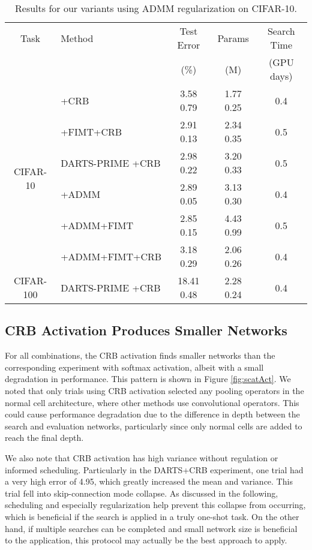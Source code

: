 \documentclass[letterpaper]{article} \usepackage{aaai22}  \usepackage{times}  \usepackage{helvet}  \usepackage{courier}  \usepackage[hyphens]{url}  \usepackage{graphicx} \urlstyle{rm} \def\UrlFont{\rm}  \usepackage{natbib}  \usepackage{caption} \DeclareCaptionStyle{ruled}{labelfont=normalfont,labelsep=colon,strut=off} \frenchspacing  \setlength{\pdfpagewidth}{8.5in}  \setlength{\pdfpageheight}{11in}  \usepackage{algorithm}
\begin{document}
\begin{table*}[tb!]
\centering \small
\begin{tabular}{@{}clccc@{}}
\toprule
Task & Method  &  Test Error \hspace{1mm} &  \hspace{1mm} Params \hspace{1mm} & \hspace{1mm} Search Time \\
 & &  (\%) \hspace{1mm} &  \hspace{1mm} (M) \hspace{1mm} & \hspace{1mm} (GPU days)
\\  \midrule
\multirow{6}{*}{CIFAR-10} 
& +CRB & 3.58  0.79 & 1.77  0.25 & 0.4 \\
& +FIMT+CRB & 2.91  0.13 & 2.34  0.35 & 0.5 \\
& DARTS-PRIME +CRB & 2.98  0.22 & 3.20  0.33 & 0.5 \\
& +ADMM & 2.89  0.05 & 3.13  0.30 & 0.4 \\
& +ADMM+FIMT & 2.85  0.15 & 4.43  0.99 & 0.5 \\
& +ADMM+FIMT+CRB & 3.18  0.29 & 2.06  0.26 & 0.4 \\
\midrule\midrule
\multirow{1}{*}{CIFAR-100} & DARTS-PRIME +CRB & 18.41  0.48 & 2.28  0.24 & 0.4 \\
\bottomrule
\end{tabular}
\caption{Results for our variants using ADMM regularization on CIFAR-10.
}
\label{table:cares}
\end{table*}

\subsection{CRB Activation Produces Smaller Networks}

For all combinations, the CRB activation finds smaller networks than the corresponding experiment with softmax activation, albeit with a small degradation in performance. This pattern is shown in Figure \ref{fig:scatAct}. We noted that only trials using CRB activation selected any pooling operators in the normal cell architecture, where other methods use convolutional operators. This could cause performance degradation due to the difference in depth between the search and evaluation networks, particularly since only normal cells are added to reach the final depth. 

We also note that CRB activation has high variance without regulation or informed scheduling. Particularly in the DARTS+CRB experiment, one trial had a very high error of 4.95, which greatly increased the mean and variance. This trial fell into skip-connection mode collapse. As discussed in the following, scheduling and especially regularization help prevent this collapse from occurring, which is beneficial if the search is applied in a truly one-shot task. On the other hand, if multiple searches can be completed and small network size is beneficial to the application, this protocol may actually be the best approach to apply.
\end{document}
